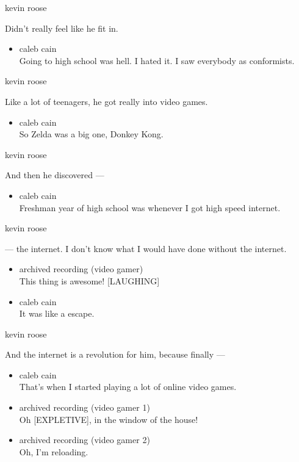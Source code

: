 kevin roose

Didn't really feel like he fit in.

\begin{itemize}
\tightlist
\item
  caleb cain\\
  Going to high school was hell. I hated it. I saw everybody as
  conformists.
\end{itemize}

kevin roose

Like a lot of teenagers, he got really into video games.

\begin{itemize}
\tightlist
\item
  caleb cain\\
  So Zelda was a big one, Donkey Kong.
\end{itemize}

kevin roose

And then he discovered ---

\begin{itemize}
\tightlist
\item
  caleb cain\\
  Freshman year of high school was whenever I got high speed internet.
\end{itemize}

kevin roose

--- the internet. I don't know what I would have done without the
internet.

\begin{itemize}
\item
  archived recording (video gamer)\\
  This thing is awesome! {[}LAUGHING{]}
\item
  caleb cain\\
  It was like a escape.
\end{itemize}

kevin roose

And the internet is a revolution for him, because finally ---

\begin{itemize}
\item
  caleb cain\\
  That's when I started playing a lot of online video games.
\item
  archived recording (video gamer 1)\\
  Oh {[}EXPLETIVE{]}, in the window of the house!
\item
  archived recording (video gamer 2)\\
  Oh, I'm reloading.
\end{itemize}

